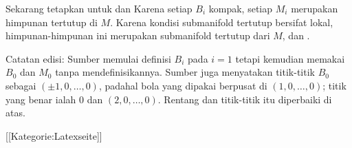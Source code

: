 Sekarang tetapkan
untuk
dan
Karena setiap $B_i$ kompak, setiap $M_i$ merupakan himpunan tertutup di $M$. Karena kondisi submanifold tertutup bersifat lokal, himpunan-himpunan ini merupakan submanifold tertutup dari $M$, dan
.

Catatan edisi: Sumber memulai definisi $B_i$ pada $i=1$ tetapi kemudian memakai $B_0$ dan $M_0$ tanpa mendefinisikannya. Sumber juga menyatakan titik-titik $B_0$ sebagai $(\pm1,0,\ldots,0)$, padahal bola yang dipakai berpusat di $(1,0,\ldots,0)$; titik yang benar ialah $0$ dan $(2,0,\ldots,0)$. Rentang dan titik-titik itu diperbaiki di atas.

 [[Kategorie:Latexseite]]
